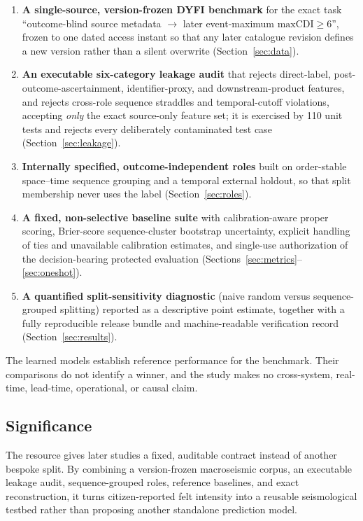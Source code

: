 \documentclass[pdflatex,sn-basic,iicol]{sn-jnl}
\begin{document}
\begin{enumerate}
\item \textbf{A single-source, version-frozen DYFI benchmark} for the exact task
``outcome-blind source metadata $\rightarrow$ later event-maximum
$\mathrm{maxCDI}\geq 6$'', frozen to one dated access instant so that any later
catalogue revision defines a new version rather than a silent overwrite
(Section~\ref{sec:data}).
\item \textbf{An executable six-category leakage audit} that rejects direct-label,
post-outcome-ascertainment, identifier-proxy, and downstream-product features,
and rejects cross-role sequence straddles and temporal-cutoff violations,
accepting \emph{only} the exact source-only feature set; it is exercised by 110
unit tests and rejects every deliberately contaminated test case
(Section~\ref{sec:leakage}).
\item \textbf{Internally specified, outcome-independent roles} built on order-stable
space--time sequence grouping and a temporal external holdout, so that split
membership never uses the label
(Section~\ref{sec:roles}).
\item \textbf{A fixed, non-selective baseline suite} with calibration-aware
proper scoring, Brier-score sequence-cluster bootstrap uncertainty, explicit handling of
ties and unavailable calibration estimates, and single-use authorization of the
decision-bearing protected evaluation
(Sections~\ref{sec:metrics}--\ref{sec:oneshot}).
\item \textbf{A quantified split-sensitivity diagnostic} (naive random versus
sequence-grouped splitting) reported as a descriptive point estimate, together with a fully
reproducible release bundle and machine-readable verification record
(Section~\ref{sec:results}).
\end{enumerate}

The learned models establish reference performance for the benchmark. Their
comparisons do not identify a winner, and the study makes no cross-system,
real-time, lead-time, operational, or causal claim.

\subsection{Significance}\label{sec:significance}

The resource gives later studies a fixed, auditable contract instead of another
bespoke split. By combining a version-frozen macroseismic corpus, an executable
leakage audit, sequence-grouped roles, reference baselines, and exact
reconstruction, it turns citizen-reported felt intensity into a reusable
seismological testbed rather than proposing another standalone prediction model.
\end{document}
